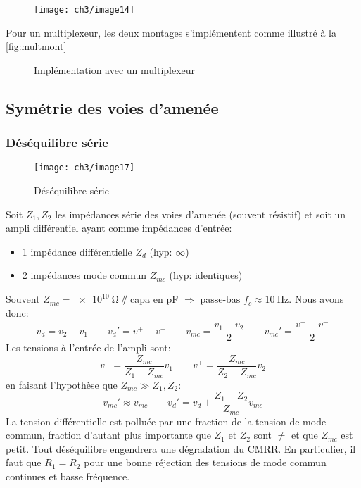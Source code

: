 \begin{figure}[H] 
	\centering 
	\texttt{[image: ch3/image14]} 
\end{figure}
Pour un multiplexeur, les deux montages s'implémentent comme illustré à la \autoref{fig:multmont}
\begin{figure}[H]
	\centering
	\caption{Implémentation avec un multiplexeur}
	\label{fig:multmont}
\end{figure}
\subsection{Symétrie des voies d'amenée}
\subsubsection{Déséquilibre série}
\begin{figure}[H] 
	\centering 
	\texttt{[image: ch3/image17]} 
	\caption{Déséquilibre série} 
\end{figure}
Soit \(Z_1, Z_2\) les impédances série des voies d'amenée (souvent résistif) et soit un ampli différentiel ayant comme impédances d'entrée:
\begin{itemize}
	\item 1 impédance différentielle \(Z_d\) (hyp: \(\infty\))
	\item 2 impédances mode commun \(Z_{mc}\) (hyp: identiques)
\end{itemize}
Souvent \(Z_{mc} = \SI{e10}{\ohm}\)  \(\mathbin{\!/\mkern-5mu/\!}\) capa en \si{\pico\farad} \(\Rightarrow \text{ passe-bas }f_c\approx \SI{10}{\hertz}\). Nous avons donc:
\[v_d = v_2-v_1\qquad v_d'=v^+-v^-\qquad v_{mc}=\frac{v_1+v_2}{2}\qquad v_{mc}'=\frac{v^++v^-}{2}\]
Les tensions à l'entrée de l'ampli sont:
\[v^-=\frac{Z_{mc}}{Z_1+Z_{mc}}v_1\qquad v^+=\frac{Z_{mc}}{Z_2+Z_{mc}}v_2\]
en faisant l'hypothèse que \(Z_{mc}\gg Z_1, Z_2\):
\[v_{mc}'\approx v_{mc}\qquad v_d'=v_d+\frac{Z_1-Z_2}{Z_{mc}}v_{mc}\]
La tension différentielle est polluée par une fraction de la tension de mode commun, fraction d'autant plus importante que \(Z_1\text{ et }Z_2\) sont \(\neq\) et que \(Z_{mc}\) est petit. Tout déséquilibre engendrera une dégradation du CMRR. En particulier, il faut que \(R_1=R_2\) pour une bonne réjection des tensions de mode commun continues et basse fréquence.
